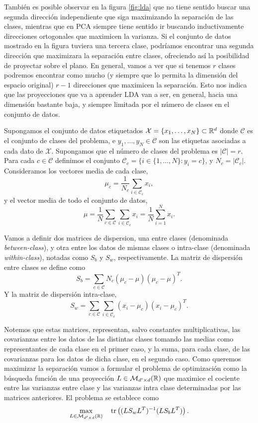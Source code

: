 También es posible observar en la figura \ref{fig:lda} que no tiene sentido buscar una segunda dirección independiente que siga maximizando la separación de las clases, mientras que en PCA siempre tiene sentido ir buscando inductivamente direcciones ortogonales que maximicen la varianza. Si el conjunto de datos mostrado en la figura tuviera una tercera clase, podríamos encontrar una segunda dirección que maximizara la separación entre clases, ofreciendo así la posibilidad de proyectar sobre el plano. En general, vamos a ver que si tenemos $r$ clases podremos encontrar como mucho (y siempre que lo permita la dimensión del espacio original) $r-1$ direcciones que maximicen la separación. Esto nos indica que las proyecciones que va a aprender LDA van a ser, en general, hacia una dimensión bastante baja, y siempre limitada por el número de clases en el conjunto de datos.

Supongamos el conjunto de datos etiquetados $\mathcal{X} = \{x_1,\dots,x_N\} \subset \mathbb{R}^d$ donde $\mathcal{C}$ es el conjunto de clases del problema, e $y_1,\dots,y_N \in \mathcal{C}$ son las etiquetas asociadas a cada dato de $\mathcal{X}$. Supongamos que el número de clases del problema es $|\mathcal{C}| = r$. Para cada $c \in \mathcal{C}$ definimos el conjunto $\mathcal{C}_c = \{ i \in \{1,\dots,N\} \colon y_i = c \}$, y $N_c = |\mathcal{C}_c|$. Consideramos los vectores media de cada clase,
\[\mu_c = \frac{1}{N_c} \sum_{i \in \mathcal{C}_c} x_i,\]
y el vector media de todo el conjunto de datos,
\[\mu = \frac{1}{N}\sum_{c \in \mathcal{C}}\sum_{i \in \mathcal{C}_c}x_i = \frac{1}{N}\sum_{i=1}^N x_i. \]

Vamos a definir dos matrices de dispersion, una entre clases (denominada \emph{between-class}), y otra entre los datos de mismas clases o intra-clase (denominada \emph{within-class}), notadas como $S_b$ y $S_w$, respectivamente. La matriz de dispersión entre clases se define como
\begin{equation}
    S_b = \sum_{c \in \mathcal{C}} N_c(\mu_c - \mu)(\mu_c - \mu)^T.
\end{equation}
Y la matriz de dispersión intra-clase,
\begin{equation}
    S_w = \sum_{c \in \mathcal{C}} \sum_{i \in \mathcal{C}_c}(x_i- \mu_c)(x_i - \mu_c)^T.
\end{equation}  

Notemos que estas matrices, representan, salvo constantes multiplicativas, las covarianzas entre los datos de las distintas clases tomando las medias como representantes de cada clase en el primer caso, y la suma, para cada clase, de las covarianzas para los datos de dicha clase, en el segundo caso. Como queremos maximizar la separación vamos a formular el problema de optimización como la búsqueda función de una proyección $L \in \mathcal{M}_{d'\times d}(\mathbb{R})$ que maximice el cociente entre las varianzas entre clase y las varianzas intra clase determinadas por las matrices anteriores. El problema se establece como
\begin{equation} \label{eq:lda}
    \max_{\substack{L \in \mathcal{M}_{d'\times d}(\mathbb{R}) }} \quad \operatorname{tr}\left((LS_wL^T)^{-1}(L S_b L^T)\right).
\end{equation}


